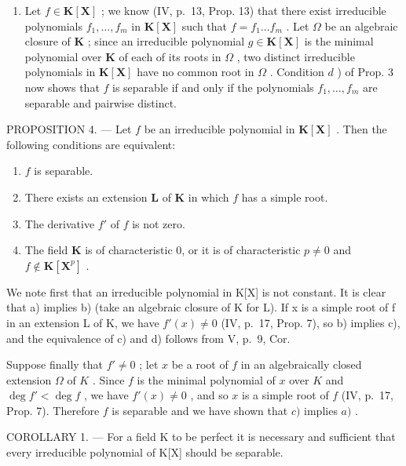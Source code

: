\begin{enumerate}
\def\labelenumi{\arabic{enumi})}
\setcounter{enumi}{1}
\tightlist
\item
  Let \(f \in \mathbf{K}[\mathbf{X}]\) ; we know (IV, p.~13, Prop. 13) that there exist irreducible polynomials \(f_1, \ldots, f_m\) in \(\mathbf{K}[\mathbf{X}]\) such that \(f = f_1 \ldots f_m\) . Let \(\Omega\) be an algebraic closure of \(\mathbf{K}\) ; since an irreducible polynomial \(g \in \mathbf{K}[\mathbf{X}]\) is the minimal polynomial over \(\mathbf{K}\) of each of its roots in \(\Omega\) , two distinct irreducible polynomials in \(\mathbf{K}[\mathbf{X}]\) have no common root in \(\Omega\) . Condition \(d\) ) of Prop. 3 now shows that \(f\) is separable if and only if the polynomials \(f_1, \ldots, f_m\) are separable and pairwise distinct.
\end{enumerate}

PROPOSITION 4. --- Let \(f\) be an irreducible polynomial in \(\mathbf{K}[\mathbf{X}]\) . Then the following conditions are equivalent:

\begin{enumerate}
\def\labelenumi{\alph{enumi})}
\item
  \(f\) is separable.
\item
  There exists an extension \(\mathbf{L}\) of \(\mathbf{K}\) in which \(f\) has a simple root.
\item
  The derivative \(f'\) of \(f\) is not zero.
\item
  The field \(\mathbf{K}\) is of characteristic 0, or it is of characteristic \(p \neq 0\) and \(f \notin \mathbf{K}[\mathbf{X}^p]\) .
\end{enumerate}

We note first that an irreducible polynomial in K{[}X{]} is not constant. It is clear that a) implies b) (take an algebraic closure of K for L). If x is a simple root of f in an extension L of K, we have \(f'(x) \neq 0\) (IV, p.~17, Prop. 7), so b) implies c), and the equivalence of c) and d) follows from V, p.~9, Cor.

Suppose finally that \(f' \neq 0\) ; let \(x\) be a root of \(f\) in an algebraically closed extension \(\Omega\) of \(K\) . Since \(f\) is the minimal polynomial of \(x\) over \(K\) and \(\deg f' < \deg f\) , we have \(f'(x) \neq 0\) , and so \(x\) is a simple root of \(f\) (IV, p.~17, Prop. 7). Therefore \(f\) is separable and we have shown that \(c)\) implies \(a)\) .

COROLLARY 1. --- For a field K to be perfect it is necessary and sufficient that every irreducible polynomial of K{[}X{]} should be separable.

